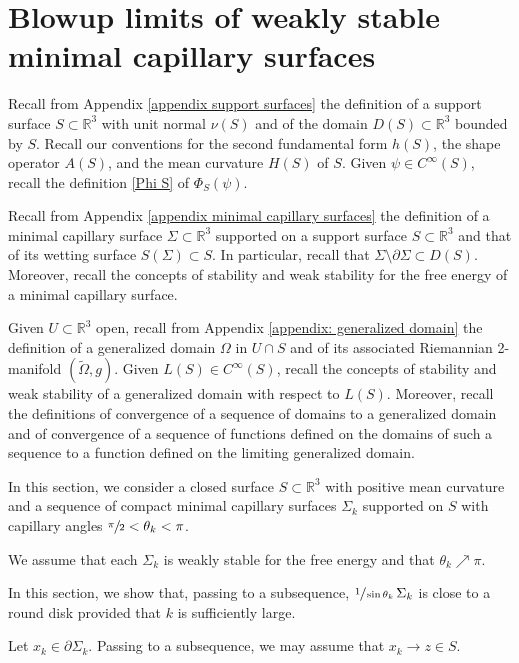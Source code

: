 \documentclass[11pt]{amsart}
\begin{document}
\section{Blowup limits of weakly stable minimal capillary surfaces}
	Recall from Appendix \ref{appendix support surfaces} the definition of a support surface $S\subset \mathbb{R}^3$ with unit normal $\nu(S)$  and of the domain $D(S)\subset \mathbb{R}^3$ bounded by $S$.  Recall  our conventions for the second fundamental form $h(S)$, the shape operator $A(S)$, and the mean curvature $H(S)$ of $S$. Given $\psi \in C^\infty(S)$, recall the definition \eqref{Phi S} of $\Phi_S(\psi)$.



Recall from Appendix \ref{appendix minimal capillary surfaces}  the  definition of a minimal capillary surface $\Sigma \subset \mathbb{R}^3$ supported on a support surface $S\subset \mathbb{R}^3$  and that of its  wetting surface $S(\Sigma)\subset S$. In particular, recall that  $\Sigma\setminus \partial \Sigma \subset D(S)$.  Moreover, recall the concepts of  stability and weak stability for the free energy  of a minimal capillary surface.

Given $U\subset \mathbb{R}^3$ open, recall from Appendix \ref{appendix: generalized domain} the definition of a generalized domain $\Omega$ in $U\cap S$ and of its associated Riemannian 2-manifold $(\tilde \Omega,g)$. Given $L(S)\in C^\infty(S)$, recall the concepts of  stability and weak stability of a generalized domain  with respect to $L(S)$.  Moreover, recall the definitions of convergence of a sequence of domains to a generalized domain and of convergence of a sequence of functions defined on the domains of such a sequence to a function defined on the limiting generalized domain.



In this section, we consider a closed surface $S\subset \mathbb{R}^3$ with positive mean curvature and a sequence of compact minimal capillary surfaces $\Sigma_k$ supported on $S$ with capillary angles $\sfrac{\pi}2<\theta_k<\pi$.

We assume  that each $\Sigma_k$ is weakly stable for the free energy and that $\theta_k\nearrow \pi$.

In this section, we show that, passing to a subsequence, $\sfrac1{\sin\theta_k}\,\Sigma_k$ is close to a round disk provided that $k$ is sufficiently large. 

Let $x_k\in \partial\Sigma_k$. Passing to a subsequence, we may assume that $x_k\to z\in S$. 
\end{document}
